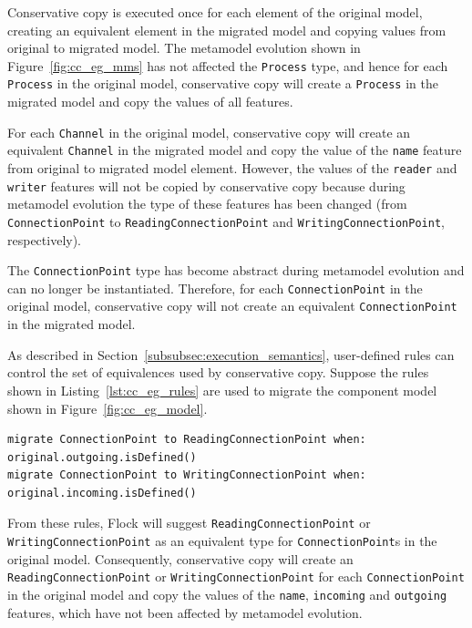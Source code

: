Conservative copy is executed once for each element of the original model, creating an equivalent element in the migrated model and copying values from original to migrated model. The metamodel evolution shown in Figure~\ref{fig:cc_eg_mms} has not affected the \texttt{Pr\-oc\-e\-ss} type, and hence for each \texttt{Pr\-oc\-e\-ss} in the original model, conservative copy will create a \texttt{Pr\-oc\-e\-ss} in the migrated model and copy the values of all features.

For each \texttt{Ch\-an\-n\-el} in the original model, conservative copy will create an equivalent \texttt{Ch\-an\-n\-el} in the migrated model and copy the value of the \texttt{na\-me} feature from original to migrated model element. However, the values of the \texttt{re\-ad\-er} and \texttt{wr\-it\-er} features will not be copied by conservative copy because during metamodel evolution the type of these features has been changed (from \texttt{Co\-nn\-ec\-ti\-o\-nP\-oi\-nt} to \texttt{Re\-a\-di\-ngCo\-nn\-ec\-ti\-o\-nP\-oi\-nt} and \texttt{Wr\-i\-ti\-ngCo\-nn\-ec\-ti\-o\-nP\-oi\-nt}, respectively).

The \texttt{Co\-nn\-ec\-ti\-o\-nP\-oi\-nt} type has become abstract during metamodel evolution and can no longer be instantiated. Therefore, for each \texttt{Co\-nn\-ec\-ti\-o\-nP\-oi\-nt} in the original model, conservative copy will not create an equivalent \texttt{Co\-nn\-ec\-ti\-o\-nP\-oi\-nt} in the migrated model.

As described in Section~\ref{subsubsec:execution_semantics}, user-defined rules can control the set of equivalences used by conservative copy. Suppose the rules shown in Listing~\ref{lst:cc_eg_rules} are used to migrate the component model shown in Figure~\ref{fig:cc_eg_model}.

\begin{lstlisting}[float=tbp, caption=Redefining equivalences for the Component model migration., label=lst:cc_eg_rules, language=Flock]
migrate ConnectionPoint to ReadingConnectionPoint when: original.outgoing.isDefined()
migrate ConnectionPoint to WritingConnectionPoint when: original.incoming.isDefined()
\end{lstlisting}

From these rules, Flock will suggest \texttt{Re\-a\-di\-ngCo\-nn\-ec\-ti\-o\-nP\-oi\-nt} or \texttt{Wr\-i\-ti\-ngCo\-nn\-ec\-ti\-o\-nP\-oi\-nt} as an equivalent type for \texttt{Co\-nn\-ec\-ti\-o\-nP\-oi\-nt}s in the original model. Consequently, conservative copy will create an \texttt{Re\-a\-di\-ngCo\-nn\-ec\-ti\-o\-nP\-oi\-nt} or \texttt{Wr\-i\-ti\-ngCo\-nn\-ec\-ti\-o\-nP\-oi\-nt} for each \texttt{Co\-nn\-ec\-ti\-o\-nP\-oi\-nt} in the original model and copy the values of the \texttt{na\-me}, \texttt{in\-co\-mi\-ng} and \texttt{ou\-tg\-oi\-ng} features, which have not been affected by metamodel evolution.

